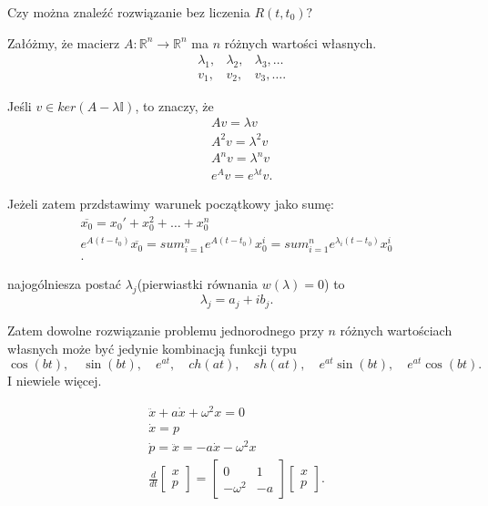 \documentclass[../main.tex]{subfiles}
\begin{document}
\begin{pytanie}
    Czy można znaleźć rozwiązanie bez liczenia $R(t,t_0)?$
\end{pytanie}
\begin{obserwacja}
    Załóżmy, że macierz $A: \mathbb{R}^n\to\mathbb{R}^n$ ma $n$ różnych wartości własnych.
    \begin{align*}
        &\lambda_1,&\lambda_2, &\lambda_3,\ldots\\
        &v_1,&v_2, &v_3,\ldots
    .\end{align*}
\end{obserwacja}
\begin{obserwacja}
    Jeśli $v\in ker(A - \lambda \mathbb{I})$, to znaczy, że
    \begin{align*}
        &A v = \lambda v\\
        &A^2 v = \lambda^2 v\\
        &A^nv = \lambda^n v\\
        &e^{A}v = e^{\lambda t}v
    .\end{align*}
\end{obserwacja}
Jeżeli zatem przdstawimy warunek początkowy jako sumę:
\begin{align*}
    \overline{x_0} = x_0' + x_0^2 + \ldots + x_0^n\\
    e^{A(t-t_0)}\overline{x_0} = sum_{i=1}^{n}e^{A(t-t_0)}x_0^i = sum_{i=1}^n e^{\lambda_i(t-t_0)}x_0^i\\
.\end{align*}
\begin{obserwacja}
    najogólniesza postać $\lambda_j$(pierwiastki równania $w(\lambda) = 0$) to
    \[
    \lambda_j = a_j + ib_j
    .\]
\end{obserwacja}
Zatem dowolne rozwiązanie problemu jednorodnego przy $n$ różnych wartościach własnych może być jedynie kombinacją funkcji typu
\[
    \cos(bt),\quad \sin(bt),\quad e^{at},\quad ch(at),\quad sh(at),\quad e^{at}\sin(bt),\quad e^{at}\cos(bt)
.\] I niewiele więcej.

\begin{align*}
    \ddot{x} + a\dot{x} + \omega^2 x = 0\\
    \dot{x} = p\\
    \dot{p} = \ddot{x} = -a \dot{x} - \omega^2 x\\
    \frac{d}{dt}\begin{bmatrix} x\\p \end{bmatrix} = \begin{bmatrix} 0&1\\-\omega^2&-a \end{bmatrix} \begin{bmatrix} x\\p \end{bmatrix}
.\end{align*}
\end{document}
